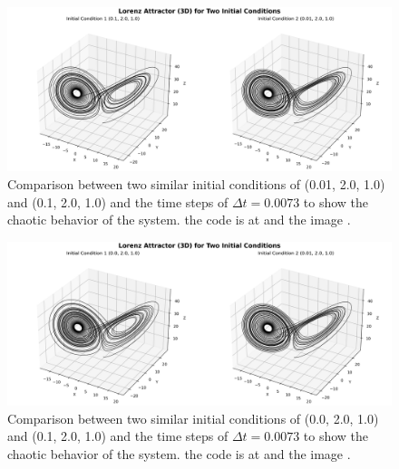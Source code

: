 \begin{figure}[!ht]
  \centering
  \includegraphics[width=0.9\linewidth]{images/two_initial_conditions_3d_separate.png}
  \caption{Comparison between two similar initial conditions of (0.01, 2.0, 1.0) and (0.1, 2.0, 1.0) and
  the time steps of $\Delta t = 0.0073$ to show the chaotic behavior of the system. the code is at \cite{youngaryantwo_initial_conditions_3d_separateICode} and the image \cite{youngaryantwo_initial_conditions_3d_separateImg}.}
  \label{fig:two_initial_conditions_3d_separate}
\end{figure}


\begin{figure}[!ht]
  \centering
  \includegraphics[width=0.9\linewidth]{images/two_initial_conditions_3d_separate_2.png}
  \caption{Comparison between two similar initial conditions of (0.0, 2.0, 1.0) and (0.1, 2.0, 1.0) and
the time steps of $\Delta t = 0.0073$ to show the chaotic behavior of the system. the code is at \cite{youngaryantwo_initial_conditions_3d_separateICode} and the image \cite{youngaryantwo_initial_conditions_3d_2separateICode}.}
  \label{fig:two_initial_conditions_3d_separate_2}
\end{figure}

